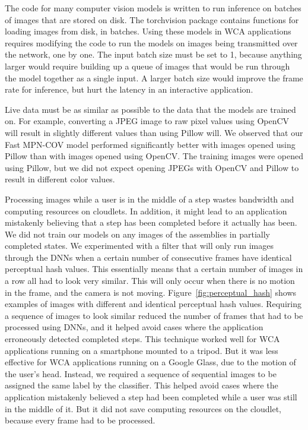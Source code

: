 The code for many computer vision models is written to run inference on batches
of images that are stored on disk. The torchvision package contains functions
for loading images from disk, in batches. Using these models in WCA applications
requires modifying the code to run the models on images being transmitted over
the network, one by one. The input batch size must be set to 1, because anything
larger would require building up a queue of images that would be run through the
model together as a single input.
A larger batch size would improve the frame rate for inference, but hurt the
latency in an interactive application.

Live data must be as similar as possible to the data that the models are trained
on. For example, converting a
JPEG image to raw pixel values using OpenCV will result in slightly different
values than using Pillow will. We observed that our Fast MPN-COV model performed
significantly better with images opened using Pillow than with images opened
using OpenCV. The training images were opened using Pillow, but we did not
expect opening JPEGs with OpenCV and Pillow to result in different color values.

Processing images while a user is in the middle of a step wastes bandwidth and
computing resources on cloudlets.
In addition, it might lead to an application mistakenly
believing that a step has been completed before it actually has been.
We did not train our models on any images of the assemblies in partially
completed states.
We experimented with a filter that will only run images through the DNNs when
a certain number of consecutive frames have identical perceptual hash values.
This essentially means that a certain number of images in a row all had to look
very similar.
This will only occur when there is no motion in the frame, and the camera is not
moving.
Figure~\ref{fig:perceptual_hash} shows examples of images with different and
identical perceptual hash values.
Requiring a sequence of images to look similar reduced the number of frames that
had to be processed using DNNs, and it helped avoid cases where the application
erroneously detected completed steps.
This technique worked well for WCA applications running on a smartphone mounted
to a tripod.
But it was less effective for WCA applications running on a Google Glass, due to
the motion of the user's head.
Instead, we required a sequence of sequential images to be assigned the same
label by the classifier.
This helped avoid cases where the application mistakenly believed a step had
been completed while a user was still in the middle of it.
But it did not save computing resources on the cloudlet, because every frame had
to be processed.

